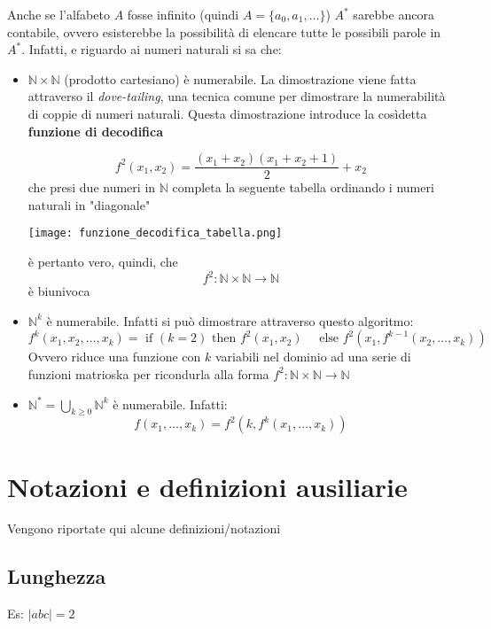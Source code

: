 Anche se l'alfabeto $A$ fosse infinito (quindi $A=\{a_0, a_1, \dots\}$) $A^*$ sarebbe ancora contabile, ovvero esisterebbe la possibilità di elencare tutte le possibili parole in $A^*$. Infatti,  e riguardo ai numeri naturali si sa che:
\begin{itemize}
    \item $\mathbb{N}\times \mathbb{N}$ (prodotto cartesiano) è numerabile. La dimostrazione viene fatta attraverso il \textit{dove-tailing}, una tecnica comune per dimostrare la numerabilità di coppie di numeri naturali. Questa dimostrazione introduce la cosìdetta \textbf{funzione di decodifica}
    
    \[
        f^2(x_1,x_2) =\frac{(x_1+x_2)(x_1+x_2+1)}{2} + x_2
    \]
    che presi due numeri in $\mathbb{N}$ completa la seguente tabella ordinando i numeri naturali in "diagonale"
    
    \texttt{[image: funzione\_decodifica\_tabella.png]}

    è pertanto vero, quindi, che
    \[
        f^2:\mathbb{N}\times \mathbb{N}\to \mathbb{N}
    \]
    è biunivoca

    \item $\mathbb{N}^k$ è numerabile. Infatti si può dimostrare attraverso questo algoritmo:
    \[
        f^k(x_1,x_2,\dots,x_k) = \text{ if } (k=2) \text{ then } f^2(x_1,x_2)
        \quad \text{ else } f^2(x_1, f^{k-1}(x_2,\dots,x_k))
    \]
    Ovvero riduce una funzione con $k$ variabili nel dominio ad una serie di funzioni matrioska per ricondurla alla forma $f^2:\mathbb{N}\times\mathbb{N}\rightarrow \mathbb{N}$
    \item $\mathbb{N}^* = \bigcup_{k\geq 0}\mathbb{N}^k$ è numerabile. Infatti:
    \[
        f(x_1,\dots,x_k) = f^2(k,f^k(x_1,\dots, x_k))    
    \]

    
\end{itemize}

\section{Notazioni e definizioni ausiliarie}
Vengono riportate qui alcune definizioni/notazioni
\subsection{Lunghezza}
Es: $|abc|=2$ 
